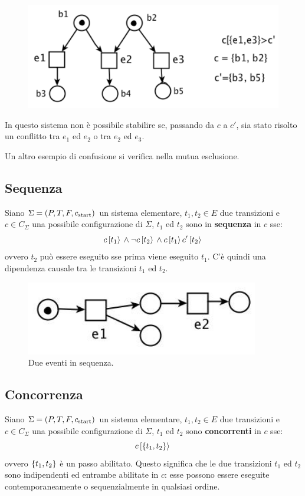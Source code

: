 \begin{figure}
    \centering
    \includegraphics[width=0.5\linewidth]{img/confusione.png}
    \label{fig:confusione}
\end{figure}
In questo sistema non è possibile stabilire se, passando da $c$ a $c'$, sia
stato risolto un conflitto tra $e_1$ ed $e_2$ o tra $e_2$ ed $e_3$.

Un altro esempio di confusione si verifica nella mutua esclusione.

\subsection*{Sequenza}
Siano $\Sigma = (P, T, F, c_{\textnormal{start}})$ un sistema elementare,
$t_1, t_2 \in E$ due transizioni e $c \in C_{\Sigma}$ una possibile configurazione
di $\Sigma$, $t_1$ ed $t_2$ sono in \textbf{sequenza} in $c$ sse:
\[
    c\,[t_1\rangle\, \land \lnot c\,[t_2\rangle\, \land
    c\,[t_1\rangle\,c'\,[t_2\rangle\,\]
ovvero $t_2$ può essere eseguito sse prima viene eseguito $t_1$.
C'è quindi una dipendenza causale tra le transizioni $t_1$ ed $t_2$.

\begin{figure}
    \centering
    \includegraphics[width=0.5\linewidth]{img/sequenza.png}
    \caption{Due eventi in sequenza.}
    \label{fig:eventi_sequenza}
\end{figure}

\subsection*{Concorrenza}
Siano $\Sigma = (P, T, F, c_{\textnormal{start}})$ un sistema elementare,
$t_1, t_2 \in E$ due transizioni e $c \in C_{\Sigma}$ una possibile configurazione
di $\Sigma$, $t_1$ ed $t_2$ sono \textbf{concorrenti} in $c$ sse:
\[
    c\,[\left\{t_1, t_2\right\}\rangle\,
\]
ovvero $\left\{t_1, t_2\right\}$ è un passo abilitato. Questo significa che le due
transizioni $t_1$ ed $t_2$ sono indipendenti ed entrambe abilitate in $c$:
esse possono essere eseguite contemporaneamente o sequenzialmente in qualsiasi
ordine.

